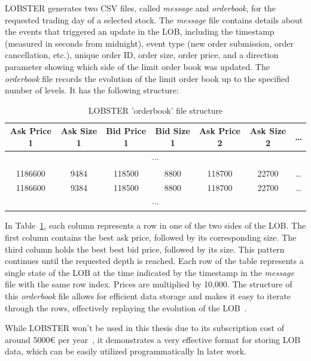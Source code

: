 \documentclass[a4paper,oneside,onecolumn,12pt]{book}
\begin{document}
	LOBSTER generates two CSV files, called \textit{message} and \textit{orderbook}, for the requested trading day of a selected stock. The \textit{message} file contains details about the events that triggered an update in the LOB, including the timestamp (measured in seconds from midnight), event type (new order submission, order cancellation, etc.), unique order ID, order size, order price, and a direction parameter showing which side of the limit order book was updated. The \textit{orderbook} file records the evolution of the limit order book up to the specified number of levels. It has the following structure: 
	\begin{table}[H]
		\begin{center}
		\begin{tabular}{|c|c|c|c|c|c|c|}
			\hline
			\textbf{Ask Price 1} & \textbf{Ask Size 1} & \textbf{Bid Price 1} & \textbf{Bid Size 1} & \textbf{Ask Price 2} & \textbf{Ask Size 2} & \textbf{\dots} \\
			\hline
			\multicolumn{7}{|c|}{$\cdots$} \\
			\hline
			1186600 & 9484  & 118500 & 8800  & 118700  & 22700  & \dots \\ 
			\hline
			1186600 & 9384  & 118500 & 8800  & 118700  & 22700  & \dots \\ 
			\hline
			\multicolumn{7}{|c|}{$\cdots$} \\
			\hline
		\end{tabular}
		\end{center}
		\caption{LOBSTER 'orderbook' file structure}
		\label{table:lobster}
	\end{table}
	In Table~\ref{table:lobster}, each column represents a row in one of the two sides of the LOB. The first column contains the best ask price, followed by its corresponding size. The third column holds the best best bid price, followed by its size. This pattern continues until the requested depth is reached. Each row of the table represents a single state of the LOB at the time indicated by the timestamp in the \textit{message} file with the same row index. Prices are multiplied by 10,000. The structure of this \textit{orderbook} file allows for efficient data storage and makes it easy to iterate through the rows, effectively replaying the evolution of the LOB~\cite{LOBSTERDS}.

	While LOBSTER won't be used in this thesis due to its subscription cost of around 5000€ per year~\cite{LOBSTERAO}, it demonstrates a very effective format for storing LOB data, which can be easily utilized programmatically ln later work.
\end{document}
